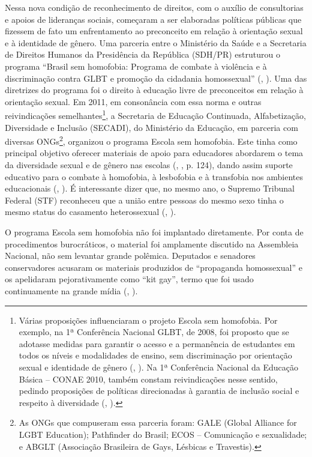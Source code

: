 \documentclass[
	12pt,				%
	openright,			%
	twoside,			%
	a4paper,			%
	english,			%
	brazil				%
	]{abntex2}
\begin{document}
 Nessa nova condição de reconhecimento de direitos, com o auxílio de consultorias e apoios de lideranças sociais, começaram a ser elaboradas políticas públicas que fizessem de fato um enfrentamento ao preconceito em relação à orientação sexual e à identidade de gênero. Uma parceria entre o Ministério da Saúde e a Secretaria de Direitos Humanos da Presidência da República (SDH/PR) estruturou o programa ``Brasil sem homofobia: Programa de combate à violência e à discriminação contra GLBT e promoção da cidadania homossexual'' (, \citeyear{brasil2004}). Uma das diretrizes do programa foi o direito à educação livre de preconceitos em relação à orientação sexual. Em 2011, em consonância com essa norma e outras reivindicações semelhantes\footnote{Várias proposições influenciaram o projeto Escola sem homofobia. Por exemplo, na 1ª Conferência Nacional GLBT, de 2008, foi proposto que se adotasse medidas para garantir o acesso e a permanência de estudantes em todos os níveis e modalidades de ensino, sem discriminação por orientação sexual e identidade de gênero (, \citeyear{brasil2008}). Na 1ª Conferência Nacional da Educação Básica -- CONAE 2010, também constam reivindicações nesse sentido, pedindo proposições de políticas direcionadas à garantia de inclusão social e respeito à diversidade (, \citeyear{brasil2010}).}, a Secretaria de Educação Continuada, Alfabetização, Diversidade e Inclusão (SECADI), do Ministério da Educação, em parceria com diversas ONGs\footnote{As ONGs que compuseram essa parceria foram: GALE (Global Alliance for LGBT Education); Pathfinder do Brasil; ECOS -- Comunicação e sexualidade; e ABGLT (Associação Brasileira de Gays, Lésbicas e Travestis).}, organizou o programa Escola sem homofobia. Este tinha como principal objetivo oferecer materiais de apoio para educadores abordarem o tema da diversidade sexual e de gênero nas escolas (, \citeyear{leite2019}, p. 124), dando assim suporte educativo para o combate à homofobia, à lesbofobia e à transfobia nos ambientes educacionais (, \citeyear{cesar2017}). É interessante dizer que, no mesmo ano, o Supremo Tribunal Federal (STF) reconheceu que a união entre pessoas do mesmo sexo tinha o mesmo status do casamento heterossexual (, \citeyear{milkolcicampana2017}).

 O programa Escola sem homofobia não foi implantado diretamente. Por conta de procedimentos burocráticos, o material foi amplamente discutido na Assembleia Nacional, não sem levantar grande polêmica. Deputados e senadores conservadores acusaram os materiais produzidos de “propaganda homossexual” e os apelidaram pejorativamente como “kit gay”, termo que foi usado continuamente na grande mídia (, \citeyear{cesar2017}). 
 
\end{document}
